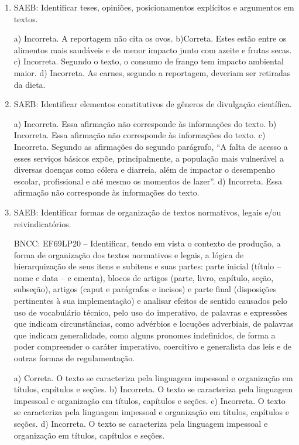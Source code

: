 \begin{enumerate}

	\item
SAEB: Identificar teses, opiniões, posicionamentos explícitos e
argumentos em textos.

a) Incorreta. A reportagem não cita os ovos.
b)Correta. Estes estão entre os alimentos mais saudáveis e de menor
impacto junto com azeite e frutas secas.
c) Incorreta. Segundo o texto, o consumo de frango tem impacto ambiental
maior.
d) Incorreta. As carnes, segundo a reportagem, deveriam ser retiradas
da dieta.

	\item
SAEB: Identificar elementos constitutivos de gêneros de divulgação científica.

a) Incorreta. Essa afirmação não corresponde às informações do texto. 
b) Incorreta. Essa afirmação não corresponde às informações do texto. 
c) Incorreta. Segundo as afirmações do segundo parágrafo, ``A falta de acesso a esses serviços básicos expõe, principalmente, a população
mais vulnerável a diversas doenças como cólera e diarreia, além de impactar o
desempenho escolar, profissional e até mesmo os momentos de lazer''.  
d) Incorreta. Essa afirmação não corresponde às informações do texto. 

	\item
SAEB:  Identificar formas de organização de textos normativos, legais
e/ou reivindicatórios.

BNCC: EF69LP20 -- Identificar, tendo em vista o contexto de produção, a
forma de organização dos textos normativos e legais, a lógica de
hierarquização de seus itens e subitens e suas partes: parte inicial
(título -- nome e data -- e ementa), blocos de artigos (parte, livro,
capítulo, seção, subseção), artigos (caput e parágrafos e incisos) e
parte final (disposições pertinentes à sua implementação) e analisar
efeitos de sentido causados pelo uso de vocabulário técnico, pelo uso do
imperativo, de palavras e expressões que indicam circunstâncias, como
advérbios e locuções adverbiais, de palavras que indicam generalidade,
como alguns pronomes indefinidos, de forma a poder compreender o caráter
imperativo, coercitivo e generalista das leis e de outras formas de
regulamentação.

a) Correta. O texto se caracteriza pela linguagem impessoal e organização em 
títulos, capítulos e seções.
b) Incorreta. O texto se caracteriza pela linguagem impessoal e organização em 
títulos, capítulos e seções. 
c) Incorreta. O texto se caracteriza pela linguagem impessoal e organização em 
títulos, capítulos e seções. 
d) Incorreta. O texto se caracteriza pela linguagem impessoal e organização em 
títulos, capítulos e seções.


\end{enumerate}
